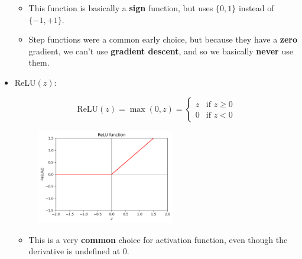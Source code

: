 \begin{itemize}
                \begin{itemize}
                    \item This function is basically a \textbf{sign} function, but uses $\{0, 1\}$ instead of $\{-1, +1\}$.
                    
                    \item Step functions were a common early choice, but because they have a \textbf{zero} gradient, we can't use \textbf{gradient descent}, and so we basically \textbf{never} use them.
                \end{itemize}
            
            
            \item {} ReLU$(z)$:
            
                \begin{equation}
                    \text{ReLU}(z) 
                    =
                    \max(0,z)
                    =
                    \begin{cases}
                      z & \text{if $z \geq 0$}\\
                      0 & \text{if $z < 0$}
                    \end{cases}
                \end{equation}
                
                \begin{figure}[H]
                    \centering
                    \includegraphics[width=60mm,scale=0.4]{images/nn_images/relu_fn.png}
                \end{figure}
                
                \begin{itemize}
                    \item This is a very \textbf{common} choice for activation function, even though the derivative is undefined at 0.
                    

\end{itemize}
\end{itemize}

